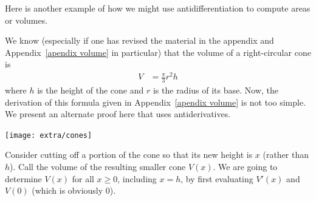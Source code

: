 Here is another example of how we might use antidifferentiation to compute
areas or volumes.
\begin{eg}\label{eg vol cone}
We know (especially if one has revised the material in the appendix and
Appendix~\ref{apendix volume} in particular) that the volume of a
right-circular cone is
\begin{align*}
  V &= \frac{\pi}{3} r^2h
\end{align*}
where $h$ is the height of the cone and $r$ is the radius of its base. Now, the
derivation of this formula given in Appendix~\ref{apendix volume} is not too
simple. We present an alternate proof here that uses antiderivatives.

\begin{wfig}
 \begin{center}
  \texttt{[image: extra/cones]}
 \end{center}
\end{wfig}

Consider cutting off a portion of the cone so that its new height is $x$
(rather than $h$). Call the volume of the resulting smaller cone $V(x)$. We are
going to determine $V(x)$ for all $x\ge 0$, including $x=h$, by first evaluating
$V'(x)$ and $V(0)$ (which is obviously $0$).


\end{eg}
